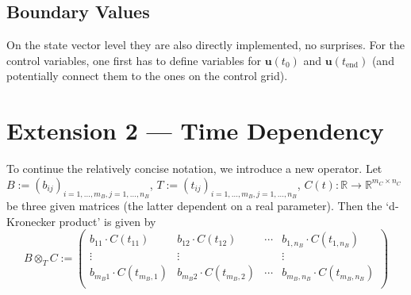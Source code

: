 \documentclass{article}
\newcommand{\defeq}{\mathrel{:=}}%
\newcommand{\kron}{\otimes}%
\newcommand{\dkron}[2][]{\mathbin{\kron_{#2}^{#1}}}%
\newcommand{\setR}{\mathbb{R}}%
\newcommand{\vectorfont}[1]{\boldsymbol{#1}}%
\newcommand{\uvec}{\vectorfont{u}}
\begin{document}
%
\subsection*{Boundary Values}
%
On the state vector level they are also directly implemented, no surprises.
For the control variables, one first has to define variables for $\uvec(t_0)$ and $\uvec(t_{\mathrm{end}})$ (and potentially connect them to the ones on the control grid).



%
\newpage

\section*{Extension 2 --- Time Dependency}

To continue the relatively concise notation, we introduce a new operator.
Let $B \defeq (b_{ij})_{i=1,\ldots,m_B, j=1,\ldots,n_B}$, $T \defeq (t_{ij})_{i=1,\ldots,m_B, j=1,\ldots,n_B}$, $C(t) %
\colon \setR \to \setR^{m_C \times n_C}$ be three given matrices (the latter dependent on a real parameter).
Then the `d-Kronecker product' is given by
\[
B \dkron{T} C \defeq \begin{pmatrix}
 b_{11} \cdot C(t_{11}) & b_{12}\cdot C(t_{12}) & \cdots & b_{1,n_B} \cdot C(t_{1,n_B}) \\
 \vdots                 & \vdots                &        & \vdots                       \\
 b_{m_B1} \cdot C(t_{m_B,1}) & b_{m_B2}\cdot C(t_{m_B,2}) & \cdots & b_{m_B,n_B} \cdot C(t_{m_B,n_B}) \\
\end{pmatrix}
\]
\end{document}

